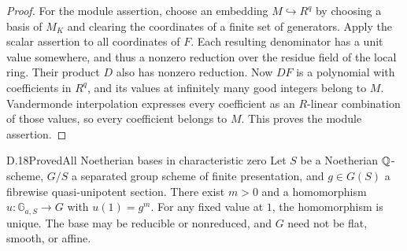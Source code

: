 \begin{proof}
For the module assertion, choose an embedding $M\hookrightarrow R^q$
by choosing a basis of $M_K$ and clearing the coordinates of a
finite set of generators. Apply the scalar assertion to all
coordinates of $F$. Each resulting denominator has a unit
value somewhere, and thus a nonzero reduction over the residue
field of the local ring. Their product $D$ also has nonzero
reduction. Now $DF$ is a polynomial with coefficients in $R^q$,
and its values at infinitely many good integers belong to $M$.
Vandermonde interpolation expresses every coefficient as an
$R$-linear combination of those values, so every coefficient
belongs to $M$. This proves the module assertion.
\end{proof}

\begin{statement}{D.18}{Proved}{All Noetherian bases in characteristic zero}
Let $S$ be a Noetherian $\mathbb Q$-scheme, $G/S$ a separated group scheme
of finite presentation, and $g\in G(S)$ a fibrewise quasi-unipotent
section. There exist $m>0$ and a homomorphism
$u:\mathbb G_{a,S}\to G$ with $u(1)=g^m$.
For any fixed value at $1$, the homomorphism is unique.
The base may be reducible or nonreduced, and $G$ need not be
flat, smooth, or affine.
\end{statement}
